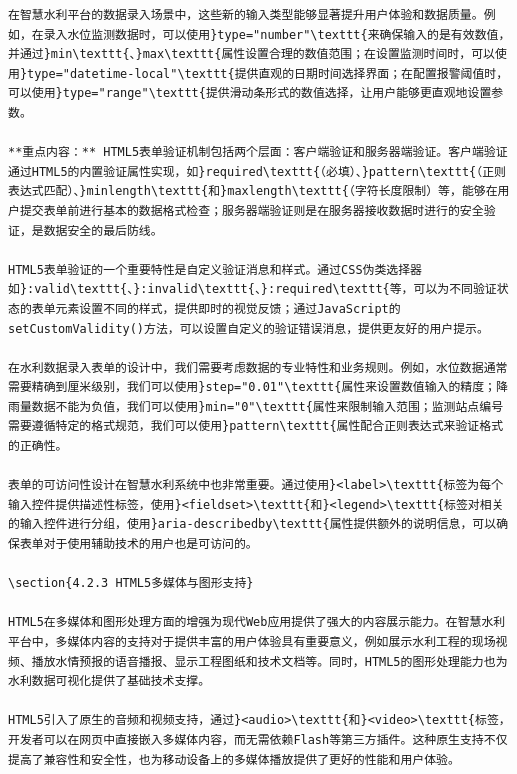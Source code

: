 \begin{lstlisting}
在智慧水利平台的数据录入场景中，这些新的输入类型能够显著提升用户体验和数据质量。例如，在录入水位监测数据时，可以使用}type="number"\texttt{来确保输入的是有效数值，并通过}min\texttt{、}max\texttt{属性设置合理的数值范围；在设置监测时间时，可以使用}type="datetime-local"\texttt{提供直观的日期时间选择界面；在配置报警阈值时，可以使用}type="range"\texttt{提供滑动条形式的数值选择，让用户能够更直观地设置参数。

**重点内容：** HTML5表单验证机制包括两个层面：客户端验证和服务器端验证。客户端验证通过HTML5的内置验证属性实现，如}required\texttt{（必填）、}pattern\texttt{（正则表达式匹配）、}minlength\texttt{和}maxlength\texttt{（字符长度限制）等，能够在用户提交表单前进行基本的数据格式检查；服务器端验证则是在服务器接收数据时进行的安全验证，是数据安全的最后防线。

HTML5表单验证的一个重要特性是自定义验证消息和样式。通过CSS伪类选择器如}:valid\texttt{、}:invalid\texttt{、}:required\texttt{等，可以为不同验证状态的表单元素设置不同的样式，提供即时的视觉反馈；通过JavaScript的setCustomValidity()方法，可以设置自定义的验证错误消息，提供更友好的用户提示。

在水利数据录入表单的设计中，我们需要考虑数据的专业特性和业务规则。例如，水位数据通常需要精确到厘米级别，我们可以使用}step="0.01"\texttt{属性来设置数值输入的精度；降雨量数据不能为负值，我们可以使用}min="0"\texttt{属性来限制输入范围；监测站点编号需要遵循特定的格式规范，我们可以使用}pattern\texttt{属性配合正则表达式来验证格式的正确性。

表单的可访问性设计在智慧水利系统中也非常重要。通过使用}<label>\texttt{标签为每个输入控件提供描述性标签，使用}<fieldset>\texttt{和}<legend>\texttt{标签对相关的输入控件进行分组，使用}aria-describedby\texttt{属性提供额外的说明信息，可以确保表单对于使用辅助技术的用户也是可访问的。

\section{4.2.3 HTML5多媒体与图形支持}

HTML5在多媒体和图形处理方面的增强为现代Web应用提供了强大的内容展示能力。在智慧水利平台中，多媒体内容的支持对于提供丰富的用户体验具有重要意义，例如展示水利工程的现场视频、播放水情预报的语音播报、显示工程图纸和技术文档等。同时，HTML5的图形处理能力也为水利数据可视化提供了基础技术支撑。

HTML5引入了原生的音频和视频支持，通过}<audio>\texttt{和}<video>\texttt{标签，开发者可以在网页中直接嵌入多媒体内容，而无需依赖Flash等第三方插件。这种原生支持不仅提高了兼容性和安全性，也为移动设备上的多媒体播放提供了更好的性能和用户体验。


\end{lstlisting}
